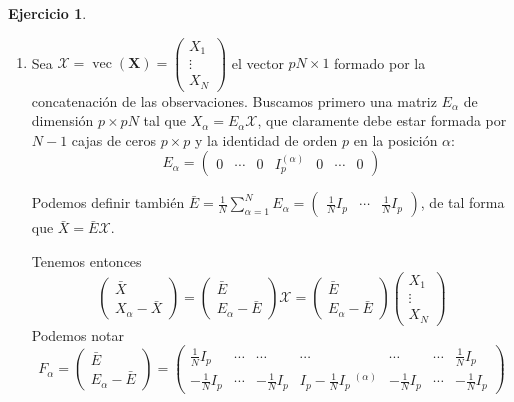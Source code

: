 \documentclass[12pt,spanish]{article}
\theoremstyle{definition}
\newtheorem{exercise}{Ejercicio}
\begin{document}
\begin{exercise} ~ %
  \begin{enumerate}[$a)$]
  \item Sea $\mathcal{X}=\operatorname{vec}(\textbf{X})=
    \begin{pmatrix}
      X_1 \\ \vdots \\ X_N
    \end{pmatrix}
    $ el vector $pN\times 1$ formado por la concatenación de las
    observaciones. Buscamos primero una matriz $E_\alpha$ de dimensión
    $p\times pN$ tal que $X_\alpha=E_\alpha\mathcal{X}$, que claramente debe estar formada por $N-1$ cajas de ceros $p\times p$ y la identidad de orden $p$ en la posición $\alpha$: \[E_\alpha=
    \begin{pmatrix}
      0 & \cdots & 0 & I_p^{(\alpha)} & 0 & \cdots & 0
    \end{pmatrix}\]

  Podemos definir también
  $\bar{E}=\frac{1}{N}\sum\limits_{\alpha=1}^{N} E_\alpha= \begin{pmatrix}
        \frac{1}{N}I_p & \cdots & \frac{1}{N}I_p
      \end{pmatrix}$, de tal forma que $\bar{X}=\bar{E}\mathcal{X}$.

  Tenemos entonces \[
    \begin{pmatrix}
      \bar{X} \\ X_\alpha-\bar{X}
    \end{pmatrix}=
    \begin{pmatrix}
        \bar{E} \\ E_\alpha-\bar{E}
      \end{pmatrix}\mathcal{X}=
    \begin{pmatrix}
        \bar{E} \\ E_\alpha-\bar{E}
      \end{pmatrix}\begin{pmatrix}
      X_1 \\ \vdots \\ X_N
    \end{pmatrix}
  \]
  Podemos notar
  \[F_\alpha=\begin{pmatrix}
        \bar{E} \\ E_\alpha-\bar{E}
      \end{pmatrix}=
      \begin{pmatrix}
        \frac{1}{N}I_p & \cdots & \cdots & \cdots & \cdots & \cdots & \frac{1}{N}I_p \\
        -\frac{1}{N}I_p & \cdots & -\frac{1}{N}I_p & I_p-\frac{1}{N}I_p~^{(\alpha)}& -\frac{1}{N}I_p & \cdots & -\frac{1}{N}I_p
      \end{pmatrix}
    \]


\end{enumerate}
\end{exercise}
\end{document}
